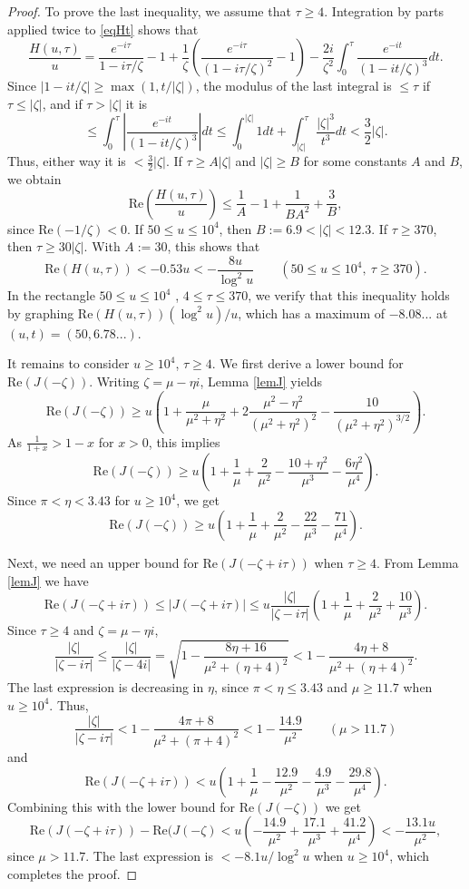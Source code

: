 \documentclass[11pt]{amsart}
\begin{document}
\begin{proof}
To prove the last inequality, we assume that $\tau \ge 4$. Integration by parts applied twice to \eqref{eqHt} shows that 
$$
\frac{H(u,\tau)}{u}=\frac{e^{-i\tau}}{1-i\tau/\zeta} -1 +\frac{1}{\zeta}\left(\frac{e^{-i\tau}}{(1-i\tau/\zeta)^2} -1 \right)
-\frac{2i}{\zeta^2}\int_0^\tau \frac{e^{-it}}{(1-it/\zeta)^3}dt.
$$
Since $|1-it/\zeta|\ge \max(1,t/|\zeta|)$, the modulus of the last integral is $\le \tau$ if $\tau \le |\zeta|$, and if $\tau > |\zeta|$ it is
$$
\le \int_0^\tau \left|\frac{e^{-it}}{(1-it/\zeta)^3}\right|dt \le \int_0^{|\zeta|} 1 dt + \int_{|\zeta|}^\tau \frac{|\zeta|^3}{t^3} dt< \frac{3}{2}|\zeta|.
$$
Thus, either way it is $< \frac{3}{2}|\zeta|$.
If $\tau\ge A|\zeta|$ and $|\zeta|\ge B$ for some constants $A$ and $B$, we obtain
$$
\mathrm{Re}\left( \frac{H(u,\tau)}{u}\right) \le  \frac{1}{A} -1 +\frac{1}{BA^2}+\frac{3}{B},
$$
since $\mathrm{Re}(-1/\zeta) <0$.
If $50\le u \le 10^4$, then $B:=6.9<|\zeta| < 12.3$. If $\tau \ge 370$, then $\tau \ge 30 |\zeta|$. 
With $A:=30$, this shows that 
$$
\mathrm{Re}(H(u,\tau)) < -0.53 u <-\frac{8u}{\log^2 u} \qquad (50\le u \le 10^4, \ \tau \ge 370).
$$
In the rectangle $50\le u \le 10^4$ , $4\le \tau \le 370$, we verify that this inequality holds by graphing 
$\mathrm{Re}(H(u,\tau)) (\log^2 u)/u$, which has a maximum of $-8.08...$ at $(u,t)=(50,6.78...)$. 

It remains to consider $u\ge 10^4$, $\tau \ge 4$. 
We first derive a lower bound for $\mathrm{Re}(J(-\zeta))$. 
Writing $\zeta=\mu-\eta i$, Lemma \ref{lemJ} yields
$$
\mathrm{Re}(J(-\zeta)) \ge u\left(1+ \frac{\mu}{\mu^2+\eta^2}+2\frac{\mu^2-\eta^2}{(\mu^2+\eta^2)^2}-\frac{10}{(\mu^2+\eta^2)^{3/2}}\right).
$$
As $\frac{1}{1+x}>1-x$ for $x>0$, this implies
$$
\mathrm{Re}(J(-\zeta)) \ge u\left(1+ \frac{1}{\mu}+\frac{2}{\mu^2}-\frac{10+\eta^2}{\mu^3}-\frac{6\eta^2}{\mu^4}\right).
$$
Since $\pi < \eta < 3.43$ for $u\ge 10^4$, we get
$$
\mathrm{Re}(J(-\zeta)) \ge u\left(1+ \frac{1}{\mu}+\frac{2}{\mu^2}-\frac{22}{\mu^3}-\frac{71}{\mu^4}\right).
$$

Next, we need an upper bound for $\mathrm{Re}(J(-\zeta+i\tau))$ when $\tau\ge 4$. 
From Lemma \ref{lemJ} we have
$$
\mathrm{Re}(J(-\zeta+i\tau))\le |J(-\zeta+i\tau)| \le u \frac{|\zeta|}{|\zeta-i\tau|}\left(1+\frac{1}{\mu}+\frac{2}{\mu^2}+\frac{10}{\mu^3}\right).
$$
Since $\tau\ge 4$ and $\zeta=\mu-\eta i$, 
$$
\frac{|\zeta|}{|\zeta-i\tau|} 
\le \frac{|\zeta|}{|\zeta- 4i|}
= \sqrt{1-\frac{8\eta+16}{\mu^2+(\eta+4)^2}}
<1-\frac{4\eta+8}{\mu^2+(\eta+4)^2}.
$$
The last expression
is decreasing in $\eta$, since $\pi<\eta\le 3.43$ and $\mu\ge 11.7$ when $u\ge 10^4$. Thus,
$$
\frac{|\zeta|}{|\zeta-i\tau|}< 1-\frac{4\pi+8}{\mu^2+(\pi+4)^2}<1-\frac{14.9}{\mu^2} \qquad (\mu >11.7)
$$
and
$$
\mathrm{Re}(J(-\zeta+i\tau))< u \left(1+\frac{1}{\mu}-\frac{12.9}{\mu^2}-\frac{4.9}{\mu^3}-\frac{29.8}{\mu^4}\right).
$$
Combining this with the lower bound for $\mathrm{Re}(J(-\zeta))$ we get
$$
\mathrm{Re}(J(-\zeta+i\tau))-\mathrm{Re}(J(-\zeta)< u\left(-\frac{14.9}{\mu^2}+\frac{17.1}{\mu^3}+\frac{41.2}{\mu^4}\right)<-\frac{13.1u}{\mu^2},
$$
since $\mu>11.7$. The last expression is $<-8.1u/\log^2 u$ when $u\ge 10^4$, which completes the proof. 
\end{proof}
\end{document}
